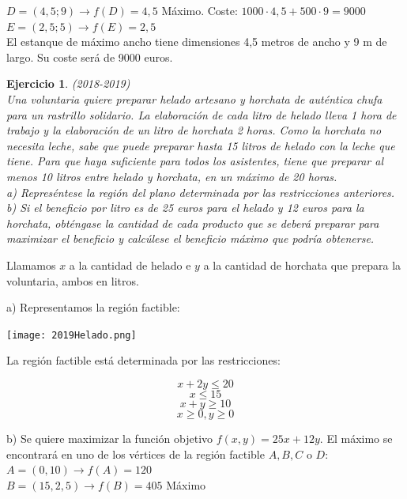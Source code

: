 \documentclass[12pt, a4paper]{amsart}
\newtheorem{ejer}{Ejercicio}
\newcommand{\s}{\color[rgb]{0,0,0.5}}
\newcommand{\n}{\color[rgb]{0,0,0}}
\begin{document}
$D=(4,5; 9) \rightarrow f(D)=4,5$ Máximo. Coste: $1000\cdot 4,5+500\cdot 9=9000$\\

$E=(2,5; 5) \rightarrow f(E)=2,5$\\

El estanque de máximo ancho tiene dimensiones 4,5 metros de ancho y 9 m de largo. Su coste será de 9000 euros.

\n

\begin{ejer}\em (2018-2019)\\
Una voluntaria quiere preparar helado artesano y horchata de auténtica chufa para un rastrillo solidario. La elaboración de cada litro de helado lleva 1 hora de trabajo y la elaboración de un litro de horchata 2 horas. Como la horchata no necesita leche, sabe que puede preparar hasta 15 litros de helado con la leche que tiene. Para que haya suficiente para todos los asistentes, tiene que preparar al menos 10 litros entre helado y horchata, en un máximo de 20 horas.\\
a) Represéntese la región del plano determinada por las restricciones anteriores.\\
b) Si el beneficio por litro es de 25 euros para el helado y 12 euros para la horchata, obténgase la cantidad de cada producto que se deberá preparar para maximizar el beneficio y calcúlese el beneficio máximo que podría obtenerse.
\end{ejer}
\s

Llamamos $x$ a la cantidad de helado e $y$ a la cantidad de horchata que prepara la voluntaria, ambos en litros.

a) Representamos la región factible:
\begin{center}
\texttt{[image: 2019Helado.png]}
\end{center}

La región factible está determinada por las restricciones:

\[x+2y\leqslant 20\]
\[x\leqslant 15\]
\[x+y \geqslant 10\]
\[x\geqslant 0, y\geqslant 0\]


b) Se quiere maximizar la función objetivo $f(x,y)=25x+12y.$ El máximo se encontrará en uno de los vértices de la región factible $A,B,C$ o $D$:\\

$A=(0,10) \rightarrow f(A)=120$\\

$B=(15,2,5) \rightarrow f(B)=405$ Máximo\\
\end{document}
